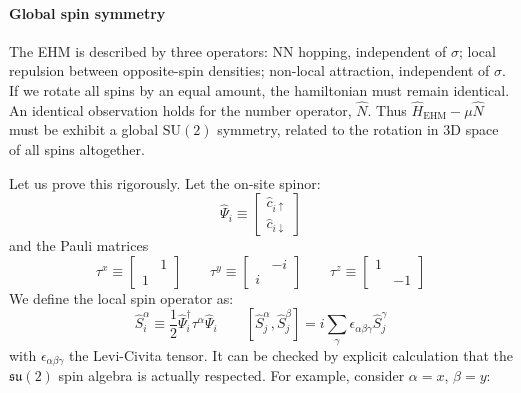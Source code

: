 \paragraph{Global spin symmetry}

The EHM is described by three operators: NN hopping, independent of $\sigma$; local repulsion between opposite-spin densities; non-local attraction, independent of $\sigma$. If we rotate all spins by an equal amount, the hamiltonian must remain identical. An identical observation holds for the number operator, $\hat N$. Thus $\hat H_\mathrm{EHM}-\mu\hat N$ must be exhibit a global $\mathrm{SU}(2)$ symmetry, related to the rotation in $3$D space of all spins altogether.

Let us prove this rigorously. Let the on-site spinor:
\[
	\hat \Psi_i \equiv \begin{bmatrix}
		\hat c_{i\uparrow} \\ \hat c_{i\downarrow}
	\end{bmatrix}
\]
and the Pauli matrices
\[
	\tau^x \equiv \begin{bmatrix}
		& 1 \\
		1 &
	\end{bmatrix}
	\qquad
	\tau^y \equiv \begin{bmatrix}
		& -i \\
		i &
	\end{bmatrix}
	\qquad
	\tau^z \equiv \begin{bmatrix}
		1 & \\
		& -1
	\end{bmatrix}
\]
We define the local spin operator as:
\[
	\hat S_i^\alpha \equiv \frac{1}{2} \hat \Psi_i^\dagger \tau^\alpha \hat \Psi_i
	\qquad
	\left[ \hat S_j^\alpha, \hat S_j^\beta \right] = i \sum_\gamma \epsilon_{\alpha\beta\gamma} \hat S_j^\gamma
\]
with $\epsilon_{\alpha\beta\gamma}$ the Levi-Civita tensor. It can be checked by explicit calculation that the $\mathfrak{su}(2)$ spin algebra is actually respected. For example, consider $\alpha=x$, $\beta=y$:

